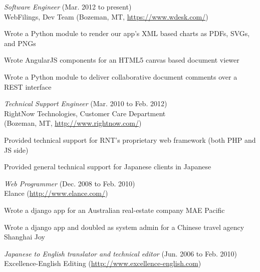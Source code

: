 \documentclass[11pt, a4paper]{article}
\begin{document}
\begin{itemize*}
  \item \emph{Software Engineer} (Mar. 2012 to present)\\
    WebFilings, Dev Team (Bozeman, MT, \url{https://www.wdesk.com/})
    \begin{itemize*}
      \item Wrote a Python module to render our app's XML based charts as PDFs, SVGs, and PNGs
      \item Wrote AngularJS components for an HTML5 canvas based document viewer
      \item Wrote a Python module to deliver collaborative document comments over a REST interface
    \end{itemize*}
  \item \emph{Technical Support Engineer} (Mar. 2010 to Feb. 2012)\\
    RightNow Technologies, Customer Care Department\\
    (Bozeman, MT, \url{http://www.rightnow.com/})
    \begin{itemize*}
      \item Provided technical support for RNT's proprietary web framework (both PHP and JS side)
      \item Provided general technical support for Japanese clients in Japanese
    \end{itemize*}
  \item \emph{Web Programmer} (Dec. 2008 to Feb. 2010)\\
    Elance (\url{http://www.elance.com/})
    \begin{itemize*}
      \item Wrote a django app for an Australian real-estate company MAE Pacific
      \item Wrote a django app and doubled as system admin for a Chinese travel agency Shanghai Joy
    \end{itemize*}
  \item \emph{Japanese to English translator and technical editor} (Jun. 2006 to Feb. 2010)\\
    Excellence-English Editing (\url{http://www.excellence-english.com})
\end{itemize*}
\end{document}
